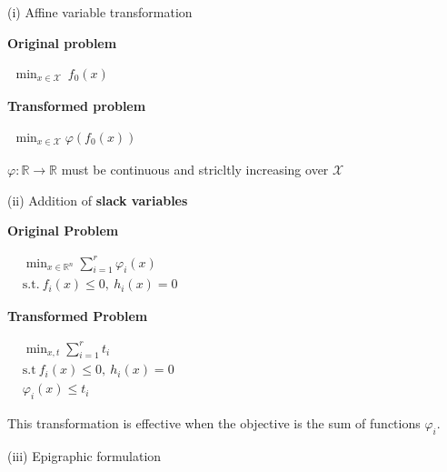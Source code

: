 \documentclass[a4paper]{article}
\begin{document}
\noindent
\textsf{\large(i) Affine variable transformation} 
\vspace{-0.3cm}
\begin{multicols}{3}
        \noindent
        \textbf{Original problem}
        \begin{center}
            $\begin{aligned}
                \min_{x\in\mathcal{X}} \ f_0(x)
            \end{aligned}$
        \end{center}
        \newcolumn
        \textbf{Transformed problem}
        \begin{center}
            $\begin{aligned}
                \min_{x\in\mathcal{X}} \varphi(f_0(x))
            \end{aligned}$
        \end{center}
        \newcolumn
        $\varphi:\mathbb{R}\to\mathbb{R}$ must be continuous and stricltly increasing over $\mathcal{X}$
\end{multicols}
\vspace{-0.3cm}
\noindent
\textsf{\large(ii) Addition of \textbf{slack variables}}
\vspace{-0.3cm}
\begin{multicols}{3}
    \noindent
    \textbf{Original Problem}
    \begin{center}
        $\begin{aligned}
            &\min_{x\in\mathbb{R}^n}  \sum_{i=1}^r {\varphi_i(x)}\\
            &\text{s.t.} \ f_i(x)\le 0, \ h_i(x)=0
        \end{aligned}$
    \end{center}
    \newcolumn
    \textbf{Transformed Problem}
    \begin{center}
        $\begin{aligned}
            &\min_{x,t} \sum_{i=1}^{r}{t_i}\\
            &\text{s.t} \ f_i(x)\le 0, \ h_i(x)=0\\
            & \varphi_i(x) \le t_i
        \end{aligned}$
    \end{center}
    \newcolumn
    This transformation is effective when the objective is the sum of functions $\varphi_i$.
\end{multicols}
\vspace{-0.3cm}
\noindent
\textsf{\large(iii) Epigraphic formulation}
\end{document}
